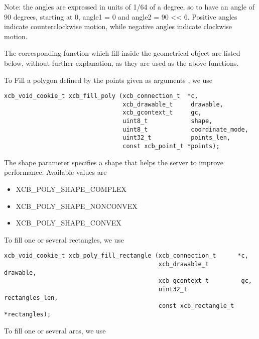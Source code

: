 \documentclass[12pt,oneside,titlepage]{book}
\providecommand{\tightlist}{%
  \setlength{\itemsep}{0pt}\setlength{\parskip}{0pt}}
\begin{document}
\begin{enumerate}
\begin{enumerate}
    Note: the angles are expressed in units of 1/64 of a degree, so to
    have an angle of 90 degrees, starting at 0, {angle1 = 0} and {angle2
    = 90 \textless\textless{} 6}. Positive angles indicate
    counterclockwise motion, while negative angles indicate clockwise
    motion.

    The corresponding function which fill inside the geometrical object
    are listed below, without further explanation, as they are used as
    the above functions.

    To Fill a polygon defined by the points given as arguments , we use

\begin{verbatim}
xcb_void_cookie_t xcb_fill_poly (xcb_connection_t  *c,
                                 xcb_drawable_t     drawable,
                                 xcb_gcontext_t     gc,
                                 uint8_t            shape,
                                 uint8_t            coordinate_mode,
                                 uint32_t           points_len,
                                 const xcb_point_t *points);
\end{verbatim}

    The {shape} parameter specifies a shape that helps the server to
    improve performance. Available values are

    \begin{itemize}
    \tightlist
    \item
      {XCB\_POLY\_SHAPE\_COMPLEX}
    \item
      {XCB\_POLY\_SHAPE\_NONCONVEX}
    \item
      {XCB\_POLY\_SHAPE\_CONVEX}
    \end{itemize}

    To fill one or several rectangles, we use

\begin{verbatim}
xcb_void_cookie_t xcb_poly_fill_rectangle (xcb_connection_t      *c,
                                           xcb_drawable_t         drawable,
                                           xcb_gcontext_t         gc,
                                           uint32_t               rectangles_len,
                                           const xcb_rectangle_t *rectangles);
\end{verbatim}

    To fill one or several arcs, we use


\end{enumerate}
\end{enumerate}
\end{document}
